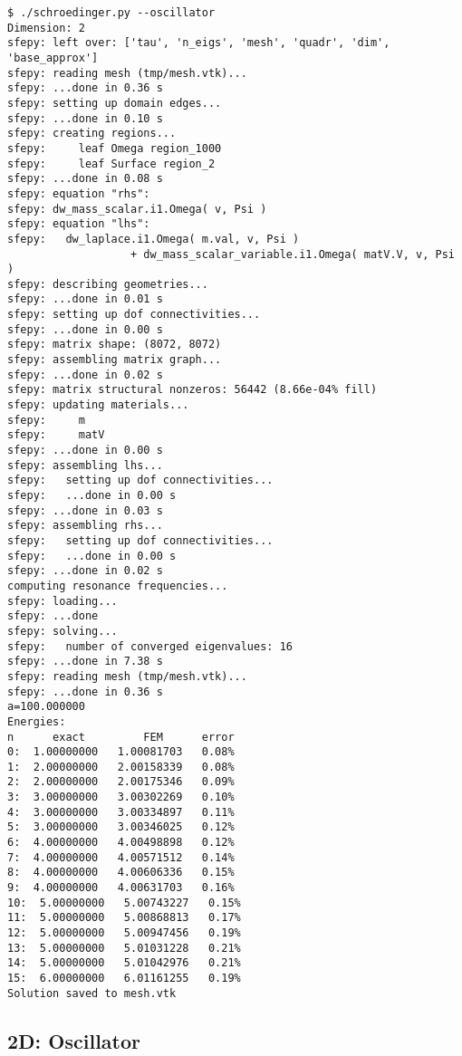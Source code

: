 \begin{lstlisting}
$ ./schroedinger.py --oscillator
Dimension: 2
sfepy: left over: ['tau', 'n_eigs', 'mesh', 'quadr', 'dim', 'base_approx']
sfepy: reading mesh (tmp/mesh.vtk)...
sfepy: ...done in 0.36 s
sfepy: setting up domain edges...
sfepy: ...done in 0.10 s
sfepy: creating regions...
sfepy:     leaf Omega region_1000
sfepy:     leaf Surface region_2
sfepy: ...done in 0.08 s
sfepy: equation "rhs":
sfepy: dw_mass_scalar.i1.Omega( v, Psi )
sfepy: equation "lhs":
sfepy:   dw_laplace.i1.Omega( m.val, v, Psi )
                   + dw_mass_scalar_variable.i1.Omega( matV.V, v, Psi )
sfepy: describing geometries...
sfepy: ...done in 0.01 s
sfepy: setting up dof connectivities...
sfepy: ...done in 0.00 s
sfepy: matrix shape: (8072, 8072)
sfepy: assembling matrix graph...
sfepy: ...done in 0.02 s
sfepy: matrix structural nonzeros: 56442 (8.66e-04% fill)
sfepy: updating materials...
sfepy:     m
sfepy:     matV
sfepy: ...done in 0.00 s
sfepy: assembling lhs...
sfepy:   setting up dof connectivities...
sfepy:   ...done in 0.00 s
sfepy: ...done in 0.03 s
sfepy: assembling rhs...
sfepy:   setting up dof connectivities...
sfepy:   ...done in 0.00 s
sfepy: ...done in 0.02 s
computing resonance frequencies...
sfepy: loading...
sfepy: ...done
sfepy: solving...
sfepy:   number of converged eigenvalues: 16
sfepy: ...done in 7.38 s
sfepy: reading mesh (tmp/mesh.vtk)...
sfepy: ...done in 0.36 s
a=100.000000
Energies:
n      exact         FEM      error
0:  1.00000000   1.00081703   0.08%
1:  2.00000000   2.00158339   0.08%
2:  2.00000000   2.00175346   0.09%
3:  3.00000000   3.00302269   0.10%
4:  3.00000000   3.00334897   0.11%
5:  3.00000000   3.00346025   0.12%
6:  4.00000000   4.00498898   0.12%
7:  4.00000000   4.00571512   0.14%
8:  4.00000000   4.00606336   0.15%
9:  4.00000000   4.00631703   0.16%
10:  5.00000000   5.00743227   0.15%
11:  5.00000000   5.00868813   0.17%
12:  5.00000000   5.00947456   0.19%
13:  5.00000000   5.01031228   0.21%
14:  5.00000000   5.01042976   0.21%
15:  6.00000000   6.01161255   0.19%
Solution saved to mesh.vtk

\end{lstlisting}

\subsection{2D: Oscillator}

